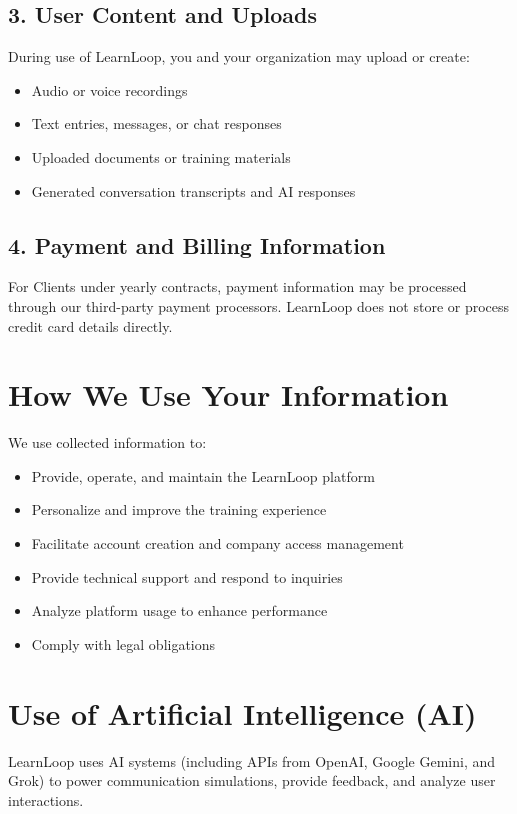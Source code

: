 \documentclass[12pt]{article}
\begin{document}
\subsection{3. User Content and Uploads}
During use of LearnLoop, you and your organization may upload or create:
\begin{itemize}[leftmargin=*]
    \item Audio or voice recordings
    \item Text entries, messages, or chat responses
    \item Uploaded documents or training materials
    \item Generated conversation transcripts and AI responses
\end{itemize}

\subsection{4. Payment and Billing Information}
For Clients under yearly contracts, payment information may be processed through our third-party payment processors. LearnLoop does not store or process credit card details directly.

\section{How We Use Your Information}
We use collected information to:
\begin{itemize}[leftmargin=*]
    \item Provide, operate, and maintain the LearnLoop platform
    \item Personalize and improve the training experience
    \item Facilitate account creation and company access management
    \item Provide technical support and respond to inquiries
    \item Analyze platform usage to enhance performance
    \item Comply with legal obligations
\end{itemize}

\section{Use of Artificial Intelligence (AI)}
LearnLoop uses AI systems (including APIs from OpenAI, Google Gemini, and Grok) to power communication simulations, provide feedback, and analyze user interactions.
\end{document}
